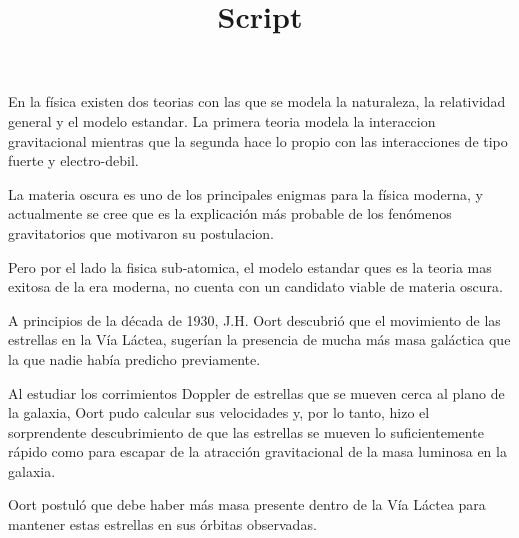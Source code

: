 \documentclass[12pt,letterpaper]{article}
\title{Script}
\newcounter{example}[enumi]
\begin{document}
	
	\begin{tcolorbox}[title= Slide \arabic{example} ]
		En la física existen dos teorias con las que se modela la naturaleza, la relatividad general y el modelo estandar. La primera teoria modela la interaccion gravitacional mientras que la segunda hace lo propio con las interacciones de tipo fuerte y electro-debil. 

		La materia oscura es uno de los principales enigmas para la física moderna, y actualmente se cree que es la explicación más probable de los fenómenos gravitatorios que motivaron su postulacion.
		
		Pero por el lado la fisica sub-atomica, el modelo estandar ques es la teoria mas exitosa de la era moderna, no cuenta con un candidato viable de materia oscura.
	
	\end{tcolorbox}
	
	\begin{tcolorbox}[title= Slide \arabic{example} ]
	
	A principios de la década de 1930, J.H. Oort descubrió que el movimiento de las estrellas en la Vía Láctea, sugerían la presencia de mucha más masa galáctica que la que nadie había predicho previamente.
	
 	Al estudiar los corrimientos Doppler de estrellas que se mueven cerca al plano de la galaxia, Oort pudo calcular sus velocidades y, por lo tanto, hizo el sorprendente descubrimiento de que las estrellas se mueven lo suficientemente rápido como para escapar de la atracción gravitacional de la masa luminosa en la galaxia.
 	
 	Oort postuló que debe haber más masa presente dentro de la Vía Láctea para mantener estas estrellas en sus órbitas observadas. %
	\end{tcolorbox}
\end{document}
